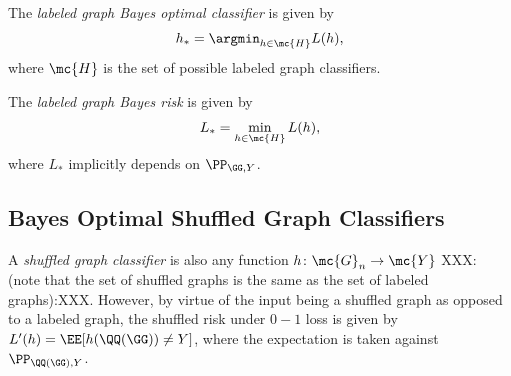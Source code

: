 \documentclass[10pt,journal,cspaper,compsoc]{IEEEtran}
\begin{document}
	The \emph{labeled graph Bayes optimal classifier} is given by
	\begin{align}
		h_* = \argmin_{h \in \mc{H}} L(h),
	\end{align}
	where $\mc{H}$ is the set of possible labeled graph classifiers.
	
	The \emph{labeled graph Bayes risk} is given by 
	\begin{align}
		L_* =\min_{h \in \mc{H}} L(h),
	\end{align}
	where $L_*$ implicitly depends on $\PP_{\GG,Y}$.




\subsection{Bayes Optimal Shuffled Graph Classifiers} %

A \emph{shuffled graph classifier} is also any function $h\colon \mc{G}_n \to \mc{Y}$ XXX: (note that the set of shuffled graphs is the same as the set of labeled graphs):XXX. However, by virtue of the input being a shuffled graph as opposed to a labeled graph, the shuffled risk under $0-1$ loss is given by $L'(h)=\EE[h(\QQ(\GG)) \neq Y]$, where the expectation is taken against $\PP_{\QQ(\GG),Y}$. %
\end{document}

